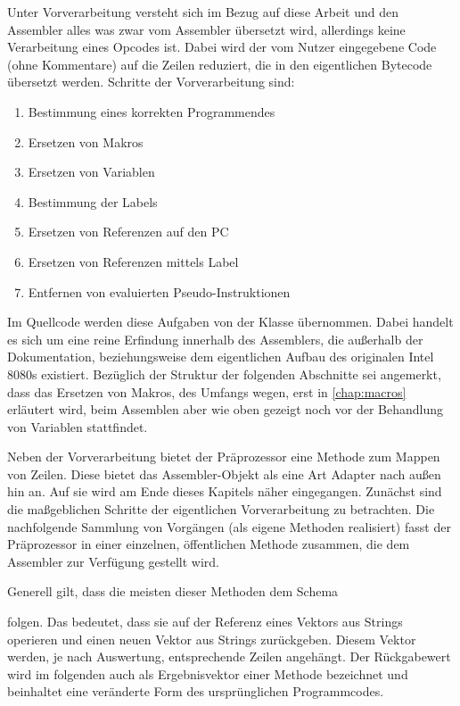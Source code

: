 Unter Vorverarbeitung versteht sich im Bezug auf diese Arbeit und den Assembler alles was zwar vom Assembler übersetzt wird, allerdings keine Verarbeitung eines Opcodes ist. Dabei wird der vom Nutzer eingegebene Code (ohne Kommentare) auf die Zeilen reduziert, die in den eigentlichen Bytecode übersetzt werden. Schritte der Vorverarbeitung sind:

\begin{enumerate}
	\item Bestimmung eines korrekten Programmendes
	\item Ersetzen von Makros
	\item Ersetzen von Variablen
	\item Bestimmung der Labels
	\item Ersetzen von Referenzen auf den \ac{PC}
	\item Ersetzen von Referenzen mittels Label
	\item Entfernen von evaluierten Pseudo-Instruktionen
\end{enumerate}

Im Quellcode werden diese Aufgaben von der Klasse  übernommen. Dabei handelt es sich um eine reine Erfindung innerhalb des Assemblers, die außerhalb der Dokumentation, beziehungsweise dem eigentlichen Aufbau des originalen Intel 8080s existiert. Bezüglich der Struktur der folgenden Abschnitte sei angemerkt, dass das Ersetzen von Makros, des Umfangs wegen, erst in \ref{chap:macros} erläutert wird, beim Assemblen aber wie oben gezeigt noch vor der Behandlung von Variablen stattfindet.

Neben der Vorverarbeitung bietet der \glqq Präprozessor\grqq{} eine Methode zum Mappen von Zeilen. Diese bietet das Assembler-Objekt als eine Art Adapter nach außen hin an. Auf sie wird am Ende dieses Kapitels näher eingegangen. Zunächst sind die maßgeblichen Schritte der eigentlichen Vorverarbeitung zu betrachten. Die nachfolgende Sammlung von Vorgängen (als eigene Methoden realisiert) fasst der Präprozessor in einer einzelnen, öffentlichen Methode  zusammen, die dem Assembler zur Verfügung gestellt wird.

Generell gilt, dass die meisten dieser Methoden dem Schema

\qquad{}

\qquad\quad{} 

folgen. Das bedeutet, dass sie auf der Referenz eines Vektors aus Strings operieren und einen neuen Vektor aus Strings zurückgeben. Diesem Vektor werden, je nach Auswertung, entsprechende Zeilen angehängt. Der Rückgabewert wird im folgenden auch als \glqq Ergebnisvektor\grqq{} einer Methode bezeichnet und beinhaltet eine veränderte Form des ursprünglichen Programmcodes.

